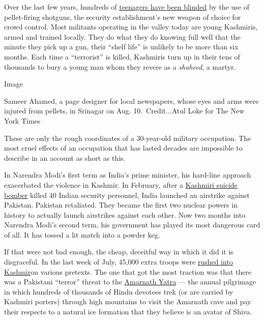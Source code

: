 Over the last few years, hundreds of
\href{https://www.nytimes.com/2016/08/29/world/asia/pellet-guns-used-in-kashmir-protests-cause-dead-eyes-epidemic.html}{teenagers
have been blinded} by the use of pellet-firing shotguns, the security
establishment's new weapon of choice for crowd control. Most militants
operating in the valley today are young Kashmiris, armed and trained
locally. They do what they do knowing full well that the minute they
pick up a gun, their ``shelf life'' is unlikely to be more than six
months. Each time a ``terrorist'' is killed, Kashmiris turn up in their
tens of thousands to bury a young man whom they revere as a
\emph{shaheed}, a martyr.

Image

Sameer Ahamed, a page designer for local newspapers, whose eyes and arms
were injured from pellets, in Srinagar on Aug. 10.~Credit...Atul Loke
for The New York Times

These are only the rough coordinates of a 30-year-old military
occupation. The most cruel effects of an occupation that has lasted
decades are impossible to describe in an account as short as this.

In Narendra Modi's first term as India's prime minister, his hard-line
approach exacerbated the violence in Kashmir. In February, after a
\href{https://www.nytimes.com/2019/03/02/opinion/sunday/kashmir-india-pakistan.html}{Kashmiri
suicide bomber} killed 40 Indian security personnel, India launched an
airstrike against Pakistan. Pakistan retaliated. They became the first
two nuclear powers in history to actually launch airstrikes against each
other. Now two months into Narendra Modi's second term, his government
has played its most dangerous card of all. It has tossed a lit match
into a powder keg.

If that were not bad enough, the cheap, deceitful way in which it did it
is disgraceful. In the last week of July, 45,000 extra troops were
\href{https://economictimes.indiatimes.com/news/defence/before-abolishing-article-370-indian-army-identified-possible-trouble-spots-in-kashmir/articleshow/70583869.cms}{rushed
into Kashmir}on various pretexts. The one that got the most traction was
that there was a Pakistani ``terror'' threat to the
\href{https://uk.reuters.com/article/uk-india-kashmir-pilgrimage/india-boosts-hindu-pilgrimage-to-holy-cave-in-conflict-torn-kashmir-idUKKCN1UN04Q}{Amarnath
Yatra} --- the annual pilgrimage in which hundreds of thousands of Hindu
devotees trek (or are carried by Kashmiri porters) through high
mountains to visit the Amarnath cave and pay their respects to a natural
ice formation that they believe is an avatar of Shiva.

